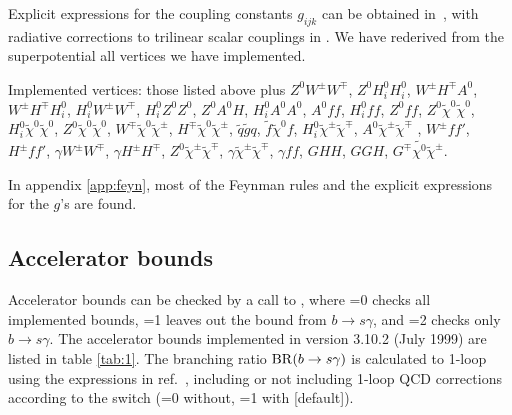 Explicit expressions for the coupling constants $g_{ijk}$ can be obtained
in~\cite{mssm}, with radiative corrections to trilinear scalar couplings in
\cite{haber97}. We have rederived from the superpotential all vertices we have
implemented.

Implemented vertices:  those listed above plus 
$Z^0W^\pm W^\mp $, $Z^0H^0_iH^0_i$, $W^\pm H^\mp A^0$,
$W^\pm H^\mp H^0_i$, $H^0_iW^\pm W^\mp $, $H^0_iZ^0Z^0$, $Z^0A^0H$,
$H^0_iA^0A^0$, $A^0ff$, $H^0_iff$, $Z^0ff$, $Z^0\tilde{\chi}^0\tilde{\chi}^0$,
$H^0_i\tilde{\chi}^0\tilde{\chi}^0$, $Z^0\tilde{\chi}^0\tilde{\chi}^0$,
$W^\mp\tilde{\chi}^0\tilde{\chi}^\pm$, $H^\mp\tilde{\chi}^0\tilde{\chi}^\pm$, $
\tilde{q}\tilde{g}q$, $\tilde{f}\tilde{\chi}^0 f$, $H^0_i\tilde{\chi}^\pm
\tilde{\chi}^\mp$, $A^0\tilde{\chi}^\pm \tilde{\chi}^\mp$ , $W^\pm f f'$,
$H^\pm f f'$, $\gamma W^\pm W^\mp$, $ \gamma H^\pm H^\mp$, $Z^0
\tilde{\chi}^\pm \tilde{\chi}^\mp$, $\gamma\tilde{\chi}^\pm \tilde{\chi}^\mp$,
$\gamma f f$, $GHH$, $GGH$, $G^\mp\tilde{\chi^0}\tilde{\chi}^\pm$.

In appendix \ref{app:feyn}, most of the Feynman rules and the explicit
expressions for the $g$'s are found.

\subsection{Accelerator bounds}

Accelerator bounds can be checked by a call to , where
=0 checks all implemented bounds, =1 leaves out the
bound from $b\to s\gamma$, and =2 checks only $b\to
s\gamma$. The accelerator bounds implemented in version 3.10.2 (July
1999) are listed in table \ref{tab:1}. The branching ratio ${\rm
BR}(b\to s\gamma)$ is calculated to 1-loop using the expressions in
ref.~\cite{bertolini91}, including or not including 1-loop QCD
corrections according to the switch  (=0 without, =1 with
[default]).

